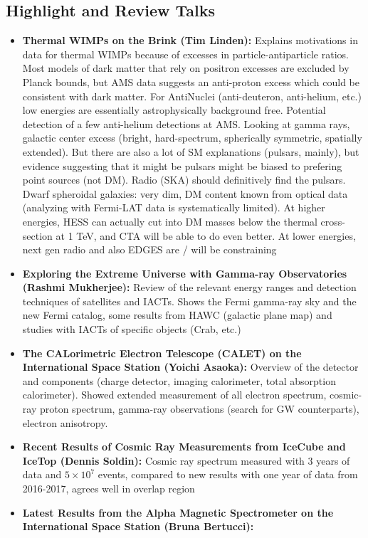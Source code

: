 \subsection{Highlight and Review Talks}
\begin{itemize}
    \item \textbf{Thermal WIMPs on the Brink (Tim Linden):} Explains motivations in data for thermal WIMPs because of excesses in particle-antiparticle ratios. Most models of dark matter that rely on positron excesses are excluded by Planck bounds, but AMS data suggests an anti-proton excess which could be consistent with dark matter. For AntiNuclei (anti-deuteron, anti-helium, etc.) low energies are essentially astrophysically background free. Potential detection of a few anti-helium detections at AMS. Looking at gamma rays, galactic center excess (bright, hard-spectrum, spherically symmetric, spatially extended). But there are also a lot of SM explanations (pulsars, mainly), but evidence suggesting that it might be pulsars might be biased to prefering point sources (not DM). Radio (SKA) should definitively find the pulsars. Dwarf spheroidal galaxies: very dim, DM content known from optical data (analyzing with Fermi-LAT data is systematically limited). At higher energies, HESS can actually cut into DM masses below the thermal cross-section at 1 TeV, and CTA will be able to do even better. At lower energies, next gen radio and also EDGES are / will be constraining
    \item \textbf{Exploring the Extreme Universe with Gamma-ray Observatories (Rashmi Mukherjee):} Review of the relevant energy ranges and detection techniques of satellites and IACTs. Shows the Fermi gamma-ray sky and the new Fermi catalog, some results from HAWC (galactic plane map) and studies with IACTs of specific objects (Crab, etc.)
    \item \textbf{ The CALorimetric Electron Telescope (CALET) on the International Space Station (Yoichi Asaoka):} Overview of the detector and components (charge detector, imaging calorimeter, total absorption calorimeter). Showed extended measurement of all electron spectrum, cosmic-ray proton spectrum, gamma-ray observations (search for GW counterparts), electron anisotropy.
    \item \textbf{Recent Results of Cosmic Ray Measurements from IceCube and IceTop (Dennis Soldin):} Cosmic ray spectrum measured with 3 years of data and $5\times10^7$ events, compared to new results with one year of data from 2016-2017, agrees well in overlap region
    \item \textbf{ Latest Results from the Alpha Magnetic Spectrometer on the International Space Station (Bruna Bertucci):} 
\end{itemize}

